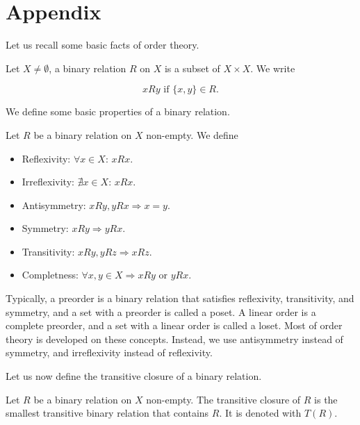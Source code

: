 \section*{Appendix}

Let us recall some basic facts of order theory.

\begin{definition}
    Let $X\neq\emptyset$, a binary relation $R$ on $X$ is a subset of $X\times X$. We write 

    \begin{equation}
        xRy \text{ if } \{x,y\}\in R.
    \end{equation}
\end{definition}

We define some basic properties of a binary relation.

\begin{definition}
    Let $R$ be a binary relation on $X$ non-empty. We define

\begin{itemize}
        \item Reflexivity: $\forall x\in X:\, xRx$.
        \item Irreflexivity: $\nexists x\in X:\, xRx$.
        \item Antisymmetry: $xRy,yRx \Rightarrow x=y$.
        \item Symmetry: $xRy \Rightarrow yRx$.
        \item Transitivity: $xRy,yRz \Rightarrow xRz$.
        \item Completness: $\forall x,y\in X \Rightarrow xRy\text{ or }yRx$.
    \end{itemize}
\end{definition}

Typically, a preorder is a binary relation that satisfies reflexivity, transitivity, and symmetry, and a set with a preorder is called a poset. A linear order is a complete preorder, and a set with a linear order is called a loset. 
Most of order theory is developed on these concepts. Instead, we use antisymmetry instead of symmetry, and irreflexivity instead of reflexivity. 


Let us now define the transitive closure of a binary relation.

\begin{definition}
    Let $R$ be a binary relation on $X$ non-empty. The transitive closure of $R$ is the smallest transitive binary relation that contains $R$. It is denoted with $T(R)$.
\end{definition}

